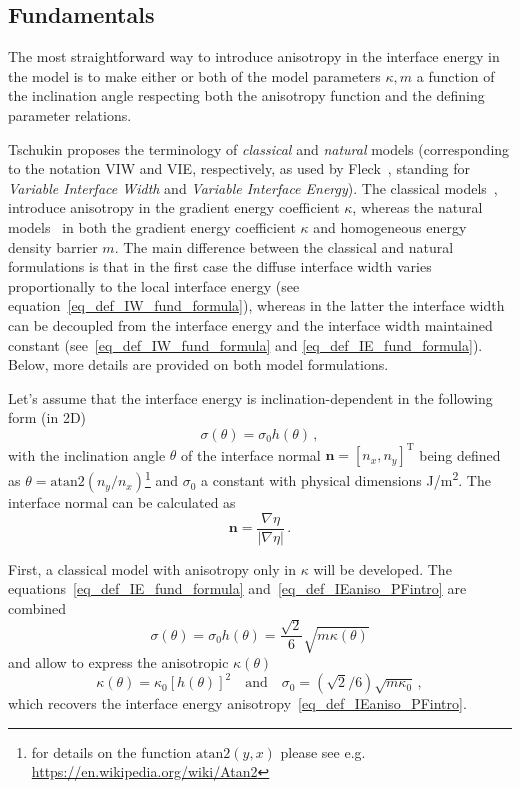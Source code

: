 	\subsection{Fundamentals} 
	The most straightforward way to introduce anisotropy in the interface energy in the model is to make either or both of the model parameters $\kappa, m$ a function of the inclination angle respecting both the anisotropy function and the defining parameter relations. 
	
	Tschukin \cite{Tschukin2017} proposes the terminology of \textit{classical} and \textit{natural} models (corresponding to the notation VIW and VIE, respectively, as used by Fleck~\cite{Fleck2011}, standing for \textit{Variable Interface Width} and \textit{Variable Interface Energy}). The classical models~\cite{Kobayashi1993,McFadden1993,Taylor1998,Eggleston2001,Wheeler2006}, introduce anisotropy in the gradient energy coefficient $\kappa$, whereas the natural models~\cite{Ma2006,Torabi2009,Fleck2011,Moelans2008} in both the gradient energy coefficient $\kappa$ and homogeneous energy density barrier $m$. The main difference between the classical and natural formulations is that in the first case the diffuse interface width varies proportionally to the local interface energy (see equation~\eqref{eq_def_IW_fund_formula}), whereas in the latter the interface width can be decoupled from the interface energy and the interface width maintained constant (see~\eqref{eq_def_IW_fund_formula} and \eqref{eq_def_IE_fund_formula}). Below, more details are provided on both model formulations.
	
	Let's assume that the interface energy is inclination-dependent in the following form (in 2D)
	\begin{equation}\label{eq_def_IEaniso_PFintro}
		\sigma(\theta)=\sigma_0 h(\theta) \,,
	\end{equation}
	with the inclination angle $\theta$ of the interface normal $\bm{n}=[n_x,n_y]^\mathrm{T}$ being defined as $\theta = \mathrm{atan2}(n_y/n_x)$\footnote{for details on the function $\mathrm{atan2}(y,x)$ please see e.g. \url{https://en.wikipedia.org/wiki/Atan2}} and $\sigma_0$ a constant with physical dimensions \unit{\J/\m^2}. The interface normal can be calculated as
	\begin{equation}
		\bm{n} = \frac{\nabla\eta}{|\nabla\eta|} \,.
	\end{equation}
	
	First, a classical model with anisotropy only in $\kappa $ will be developed. The equations~\eqref{eq_def_IE_fund_formula} and~\eqref{eq_def_IEaniso_PFintro} are combined 
	\begin{equation}
		\sigma(\theta) = \sigma_0 h(\theta) = \frac{\sqrt{2}}{6}\sqrt{m\kappa(\theta)}
	\end{equation}
	and allow to express the anisotropic $\kappa(\theta)$
	\begin{equation}
		\kappa(\theta) = \kappa_0 [h(\theta)]^2 \quad \mathrm{and} \quad \sigma_0=(\sqrt{2}/6)\sqrt{m\kappa_0} \,,
	\end{equation}
	which recovers the interface energy anisotropy~\eqref{eq_def_IEaniso_PFintro}.
	
